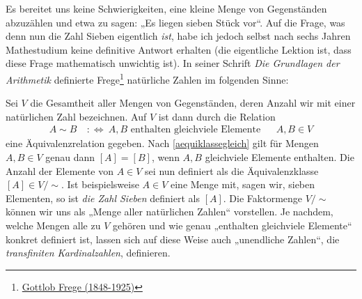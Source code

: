 \begin{bsp}
    Es bereitet uns keine Schwierigkeiten, eine kleine Menge von Gegenständen abzuzählen und etwa zu sagen: „Es liegen sieben Stück vor“. Auf die Frage, was denn nun die Zahl Sieben eigentlich \emph{ist}, habe ich jedoch selbst nach sechs Jahren Mathestudium keine definitive Antwort erhalten (die eigentliche Lektion ist, dass diese Frage mathematisch unwichtig ist). In seiner Schrift \emph{Die Grundlagen der Arithmetik} definierte Frege\footnote{\href{https://de.wikipedia.org/wiki/Gottlob_Frege}{Gottlob Frege (1848-1925)}} natürliche Zahlen im folgenden Sinne:

    Sei $V$ die Gesamtheit aller Mengen von Gegenständen, deren Anzahl wir mit einer natürlichen Zahl bezeichnen. Auf $V$ ist dann durch die Relation
    \begin{align*}
         A\sim B \ &:\Leftrightarrow\ \text{$A,B$ enthalten gleichviele Elemente} && A,B\in V
    \end{align*}
    eine Äquivalenzrelation gegeben. Nach \cref{aequiklassegleich} gilt für Mengen $A,B\in V$ genau dann $[A]=[B]$, wenn $A,B$ gleichviele Elemente enthalten. Die Anzahl der Elemente von $A\in V$ sei nun definiert als die Äquivalenzklasse $[A]\in V/{\sim}$. Ist beispielsweise $A\in V$ eine Menge mit, sagen wir, sieben Elementen, so ist \emph{die Zahl Sieben} definiert als $[A]$. Die Faktormenge $V/{\sim}$ können wir uns als „Menge aller natürlichen Zahlen“ vorstellen. Je nachdem, welche Mengen alle zu $V$ gehören und wie genau „enthalten gleichviele Elemente“ konkret definiert ist, lassen sich auf diese Weise auch „unendliche Zahlen“, die \emph{transfiniten Kardinalzahlen}, definieren.
\end{bsp}


